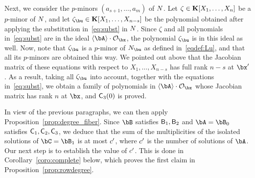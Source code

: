 \documentclass[12pt]{article}
\begin{document}
Next, we consider the $p$-minors $(a_{s+1},\dots,a_m)$ of ${N}$. Let
$\zeta \in\mathbf{K}[X_1,\dots,X_n]$ be a $p$-minor of ${N}$, and let
$\zeta_\bu \in \KK[X_1,\dots,X_{n-s}]$ be the polynomial obtained
after applying the substitution in~\eqref{eq:subst} in ${N}$. Since
$\zeta$ and all polynomials in~\eqref{eq:subst} are in the ideal
$\langle \bA \rangle \cdot \mathcal{O}_\bx$, the polynomial
$\zeta_\bu$ is in this ideal as well. Now, note that $\zeta_\bu$ is a
$p$-minor of $\mN_\bu$ as defined in~\eqref{eqdef:Lu}, and that all
its $p$-minors are obtained this way. We pointed out above that the
Jacobian matrix of these equations with respect to $X_1,\dots,X_{n-s}$
has full rank $n-s$ at $\bx'$. As a result, taking all $\zeta_\bu$ into account,
together with the equations in~\eqref{eq:subst}, we obtain 
a family of polynomials in $\langle \bA \rangle \cdot \mathcal{O}_\bx$ 
whose Jacobian matrix has rank $n$ at $\bx$, and $\mathsf{C}_3(0)$ is proved.

\medskip

In view of the previous paragraphs,
we can then apply Proposition~\ref{prop:degree_fiber}. Since $\bB$
satisfies $\mathsf{B}_1,\mathsf{B}_2$ and $\bA=\bB_0$ satisfies
$\mathsf{C}_1,\mathsf{C}_2,\mathsf{C}_3$, we deduce that the sum of the
multiplicities of the isolated solutions of $\bC=\bB_1$ is at most
${c'}{}$, where ${c'}{}$ is the number of solutions of $\bA$. Our next step
is to establish the value of ${c'}{}$. This is done in Corollary~\ref{coro:complete}
below, which proves the first claim in Proposition~\ref{prop:rowdegree}.
\end{document}
